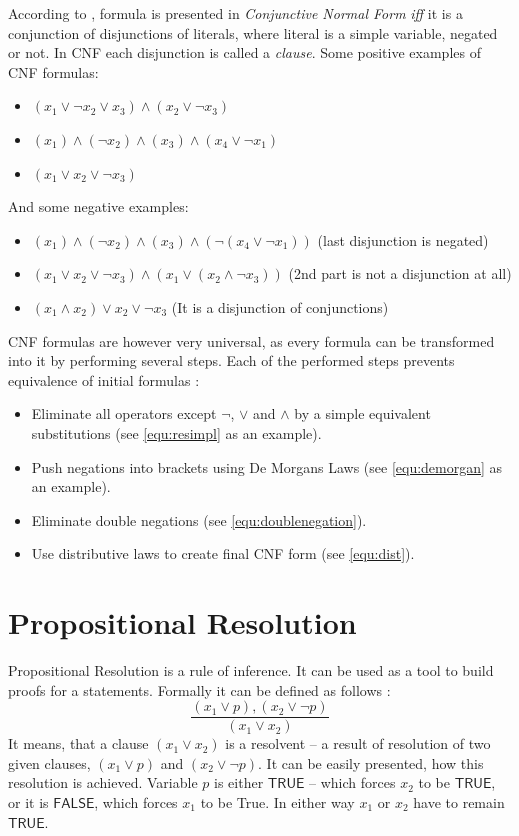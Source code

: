 \documentclass[12pt,english,pdflatex]{aghdpl}
\begin{document}
According to \cite{ben-ari:2001}, formula is presented in \textit{Conjunctive Normal Form} \textit{iff} it is a conjunction of disjunctions of literals, where literal is a simple variable, negated or not. In CNF each disjunction is called a  \textit{clause}.
Some positive examples of CNF formulas:
\begin{itemize}
\item $(x_1 \vee \neg x_2 \vee x_3) \wedge (x_2 \vee \neg x_3)$
\item $(x_1) \wedge (\neg x_2) \wedge (x_3) \wedge (x_4 \vee \neg x_1)$
\item $(x_1 \vee x_2 \vee \neg x_3)$
\end{itemize}
And some negative examples:
\begin{itemize}
\item $(x_1) \wedge (\neg x_2) \wedge (x_3) \wedge (\neg(x_4 \vee \neg x_1))$ (last disjunction is negated)
\item $(x_1 \vee x_2 \vee \neg x_3) \wedge (x_1 \vee (x_2 \wedge \neg x_3))$ (2nd part is not a disjunction at all)
\item $(x_1 \wedge x_2) \vee x_2 \vee \neg x_3$ (It is a disjunction of conjunctions)
\end{itemize}
CNF formulas are however very universal, as every formula can be transformed into it by performing several steps. Each of the performed steps prevents equivalence of initial formulas \cite{ben-ari:2001}:
\begin{itemize}
\item Eliminate all operators except $\neg$, $\vee$ and $\wedge$ by a simple equivalent substitutions (see \ref{equ:resimpl} as an example).
\item Push negations into brackets using De Morgans Laws (see \ref{equ:demorgan} as an example).
\item Eliminate double negations (see \ref{equ:doublenegation}).
\item Use distributive laws to create final CNF form (see \ref{equ:dist}).
\end{itemize}

\section{Propositional Resolution}
\label{sec:resolution}

Propositional Resolution is a rule of inference. It can be used as a tool to build proofs for a statements. Formally it can be defined as follows \cite{ben-ari:2001}:
\[
\frac{(x_1 \vee p),(x_2 \vee \neg p)}{(x_1 \vee x_2)}
\]
It means, that a clause $(x_1 \vee x_2)$ is a resolvent -- a result of resolution of two given clauses, $(x_1 \vee p)$ and $(x_2 \vee \neg p)$. It can be easily presented, how this resolution is achieved. Variable $p$ is either $\mathsf{TRUE}$ -- which forces $x_2$ to be $\mathsf{TRUE}$, or it is $\mathsf{FALSE}$, which forces $x_1$ to be True. In either way $x_1$ or $x_2$ have to remain $\mathsf{TRUE}$.
\end{document}
